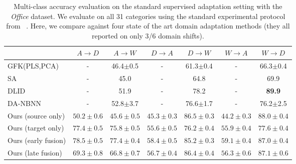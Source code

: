 \begin{table*}
  \setlength{\tabcolsep}{4pt}
  \scriptsize
\centering
\begin{tabular}{lcccccc}
\toprule
                     & $A \rightarrow D$   & $A \rightarrow W$   & $D \rightarrow A$   & $D \rightarrow W$   & $W \rightarrow A$   & $W \rightarrow D$   \\
\midrule
GFK(PLS,PCA)~\cite{gong-cvpr12} & - & 46.4$\pm$0.5 & - & 61.3$\pm$0.4 & - & 66.3$\pm$0.4\\
SA~\cite{fernando-iccv13} & - & 45.0 & - & 64.8 & - & 69.9\\
DLID~\cite{ref:dlid} & - & 51.9 & - & 78.2 & - & \bf{89.9}\\     
DA-NBNN~\cite{da-nbnn} & - & 52.8$\pm$3.7 & - & 76.6$\pm$1.7 &           - & 76.2$\pm$2.5\\
\midrule
 Ours (source only)   & $50.2 \pm 0.6$     & $45.6 \pm 0.5$     & $45.3 \pm 0.3$     & $\bm{86.5 \pm 0.3}$     & $44.2 \pm 0.3$     & $88.0 \pm 0.4$     \\
 Ours (target only)   & $77.4 \pm 0.5$     & $75.8 \pm 0.5$     & $55.6 \pm 0.5$     & $76.2 \pm 0.4$     & $55.9 \pm 0.4$     & $77.6 \pm 0.4$     \\
Ours (early fusion)& $\bm{78.5 \pm 0.5}$     & $\bm{77.4 \pm 0.4}$     & $\bm{58.4 \pm 0.5}$     & $85.2 \pm 0.3$     & $\bm{59.1 \pm 0.4}$     & $87.0 \pm 0.4$     \\
Ours (late fusion)& $69.3 \pm 0.8$ & $66.8 \pm 0.7$ & $56.7 \pm 0.4$ & $86.4 \pm 0.4$ & $56.3 \pm 0.6$ & $87.1 \pm 0.6$ \\
\bottomrule
\end{tabular}

\caption{Multi-class accuracy evaluation on the standard supervised adaptation setting with the \emph{Office} dataset. We evaluate on all 31 categories using the standard experimental protocol from ~\cite{saenko-eccv10}. Here, we compare against four state of the art domain adaptation methods (they all reported on only 3/6 domain shifts).}
\label{table:full-semi}
\end{table*}

